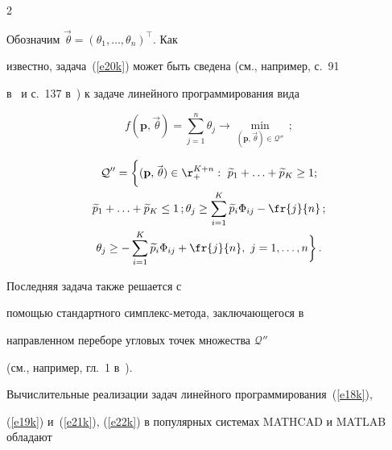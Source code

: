 \begin{multicols}{2}
\begin{equation}
\label{e20k}


\end{equation}


Обозначим $\vec{\,\theta}=(\theta_1,\ldots,\theta_n)^{\top}$. Как


известно, задача~(\ref{e20k}) может быть сведена (см., например, с.~91


в~\cite{7k} и с.~137 в~\cite{8k}) к задаче линейного программирования вида


\begin{equation}


f({\mathbf p},\vec{\,\theta})=


\sum_{j=1}^n\theta_j\longrightarrow\min_{({\mathbf


p},{\vec{\,\theta}})\in{\mathcal Q''}}\,;


\label{e21k}


\end{equation}


\begin{multline}


{\mathcal


Q''}=\bigg\{({\mathbf p},{\vec{\,\theta}})\in\r_+^{K+n}:\


\widetilde p_1+\ldots+\widetilde p_K\ge1;\\


\widetilde p_1+\ldots+\widetilde p_K \le 1\,;


\theta_j\ge\sum_{i=1}^K


\widetilde p_i\Phi_{ij}-\fr{j}{n}\,;\\


\theta_j  \ge-\sum_{i=1}^K


\widetilde p_i\Phi_{ij}+\fr{j}{n},\


j=1,\ldots,n\bigg\}\,.\label{e22k}


\end{multline}


Последняя задача также решается с


помощью стандартного симплекс-метода, заключающегося в


направленном переборе угловых точек множества ${\mathcal Q''}$


(см., например, гл.~1 в~\cite{7k}).





Вычислительные реализации задач линейного программирования~(\ref{e18k}),


(\ref{e19k}) и~(\ref{e21k}), (\ref{e22k}) в популярных системах MATHCAD и MATLAB обладают



\end{multicols}
